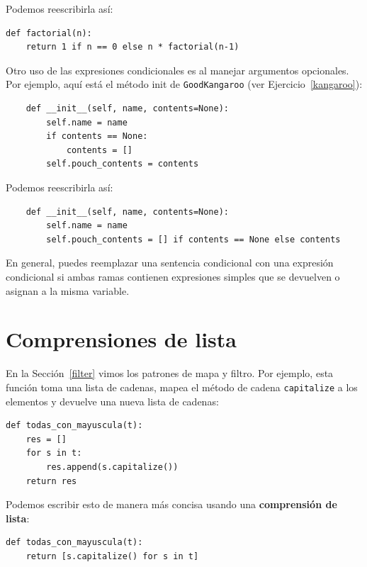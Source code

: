 \documentclass[10pt]{book}
\begin{document}
Podemos reescribirla así:

\begin{verbatim}
def factorial(n):
    return 1 if n == 0 else n * factorial(n-1)
\end{verbatim}

Otro uso de las expresiones condicionales es al manejar argumentos
opcionales.  Por ejemplo, aquí está el método init de
{\tt GoodKangaroo} (ver Ejercicio~\ref{kangaroo}):

\begin{verbatim}
    def __init__(self, name, contents=None):
        self.name = name
        if contents == None:
            contents = []
        self.pouch_contents = contents
\end{verbatim}

Podemos reescribirla así:

\begin{verbatim}
    def __init__(self, name, contents=None):
        self.name = name
        self.pouch_contents = [] if contents == None else contents
\end{verbatim}

En general, puedes reemplazar una sentencia condicional con una expresión
condicional si ambas ramas contienen expresiones simples que se
devuelven o asignan a la misma variable.



\section{Comprensiones de lista}

En la Sección~\ref{filter} vimos los patrones de mapa y filtro.  Por
ejemplo, esta función toma una lista de cadenas, mapea el método de cadena
{\tt capitalize} a los elementos y devuelve una nueva lista de cadenas:

\begin{verbatim}
def todas_con_mayuscula(t):
    res = []
    for s in t:
        res.append(s.capitalize())
    return res
\end{verbatim}

Podemos escribir esto de manera más concisa usando una {\bf comprensión de lista}:

\begin{verbatim}
def todas_con_mayuscula(t):
    return [s.capitalize() for s in t]
\end{verbatim}
\end{document}
